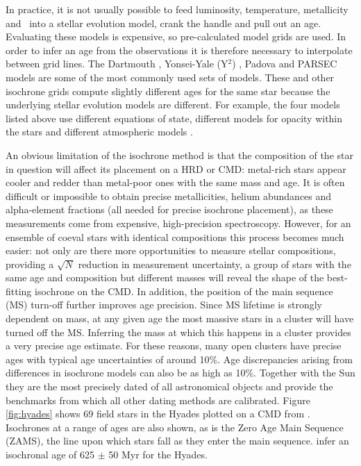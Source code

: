 In practice, it is not usually possible to feed luminosity, temperature,
metallicity and \logg\ into a stellar evolution model, crank the handle and
pull out an age.
Evaluating these models is expensive, so pre-calculated model grids are used.
In order to infer an age from the observations it is therefore necessary to
interpolate between grid lines.
The Dartmouth \citep{Dotter2008}, Yonsei-Yale (Y$^2$) \citep{Yi2001,
Spada2013}, Padova \citep{Girardi2002} and PARSEC \citep{Bressan2012} models
are some of the most commonly used sets of models.
These and other isochrone grids compute slightly different ages for the same
star because the underlying stellar evolution models are different.
For example, the four models listed above use different equations of state,
different models for opacity within the stars and different atmospheric
models \citep[see][for a comparison of these four sets of
isochrones]{Thompson2014}.

An obvious limitation of the isochrone method is that the composition of the
star in question will affect its placement on a HRD or CMD: metal-rich stars
appear cooler and redder than metal-poor ones with the same mass and age.
It is often difficult or impossible to obtain precise metallicities, helium
abundances and alpha-element fractions (all needed for precise isochrone
placement), as these measurements come from expensive, high-precision
spectroscopy.
However, for an ensemble of coeval stars with identical compositions this
process becomes much easier: not only are there more opportunities to measure
stellar compositions, providing a $\sqrt N$ reduction in measurement
uncertainty, a group of stars with the same age and composition but different
masses will reveal the shape of the best-fitting isochrone on the CMD\@.
In addition, the position of the main sequence (MS) turn-off further improves
age precision.
Since MS lifetime is strongly dependent on mass, at any given age the most
massive stars in a cluster will have turned off the MS.
Inferring the mass at which this happens in a cluster provides a very precise
age estimate.
For these reasons, many open clusters have precise ages with typical age
uncertainties of around 10\%.
Age discrepancies arising from differences in isochrone models can also be as
high as 10\%.
Together with the Sun they are the most precisely dated of all astronomical
objects and provide the benchmarks from which all other dating methods are
calibrated.
Figure \ref{fig:hyades} shows 69 field stars in the Hyades plotted on a CMD
from \citet{Perryman1998}.
Isochrones at a range of ages are also shown, as is the Zero Age Main Sequence
(ZAMS), the line upon which stars fall as they enter the main sequence.
\citet{Perryman1998} infer an isochronal age of 625 $\pm$ 50 Myr for the
Hyades.

